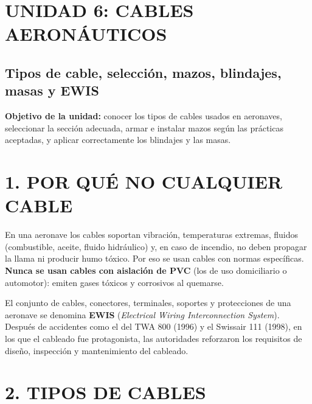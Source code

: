 \clearpage
\section*{UNIDAD 6: CABLES AERONÁUTICOS}
\subsection*{Tipos de cable, selección, mazos, blindajes, masas y EWIS}

\begin{recuadro}
\textbf{Objetivo de la unidad:} conocer los tipos de cables usados en aeronaves, seleccionar la
sección adecuada, armar e instalar mazos según las prácticas aceptadas, y aplicar correctamente
los blindajes y las masas.
\end{recuadro}

\section*{1. POR QUÉ NO CUALQUIER CABLE}

En una aeronave los cables soportan vibración, temperaturas extremas, fluidos (combustible,
aceite, fluido hidráulico) y, en caso de incendio, no deben propagar la llama ni producir humo
tóxico. Por eso se usan cables con normas específicas. \textbf{Nunca se usan cables con aislación
de PVC} (los de uso domiciliario o automotor): emiten gases tóxicos y corrosivos al quemarse.

El conjunto de cables, conectores, terminales, soportes y protecciones de una aeronave se denomina
\textbf{EWIS} (\textit{Electrical Wiring Interconnection System}). Después de accidentes como el
del TWA 800 (1996) y el Swissair 111 (1998), en los que el cableado fue protagonista, las
autoridades reforzaron los requisitos de diseño, inspección y mantenimiento del cableado.

\section*{2. TIPOS DE CABLES}

